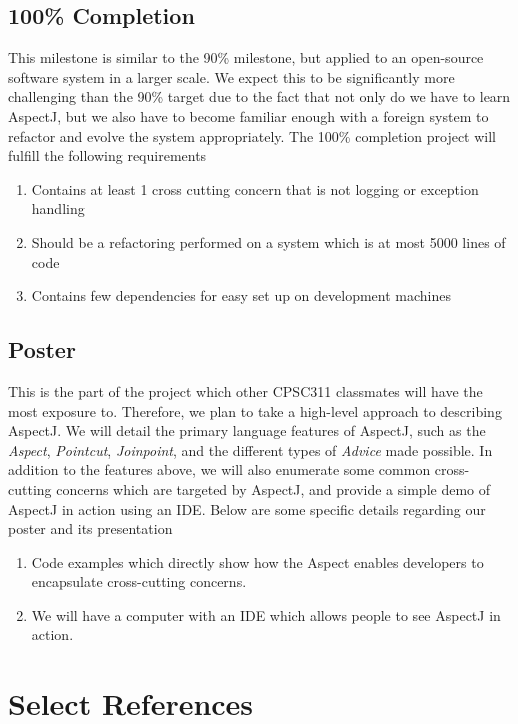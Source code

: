 \documentclass[sigconf]{acmart}
\begin{document}
\subsection{100\% Completion}
This milestone is similar to the 90\% milestone, but applied to an open-source software system in a larger scale. We expect this to be significantly more challenging than the 90\% target due to the fact that not only do we have to learn AspectJ, but we also have to become familiar enough with a foreign system to refactor and evolve the system appropriately. The 100\% completion project will fulfill the following requirements
\begin{enumerate}
    \item Contains at least 1 cross cutting concern that is not logging or exception handling
    \item Should be a refactoring performed on a system which is at most 5000 lines of code
    \item Contains few dependencies for easy set up on development machines
\end{enumerate}

\subsection{Poster}
This is the part of the project which other CPSC311 classmates will have the most exposure to. Therefore, we plan to take a high-level approach to describing AspectJ. We will detail the primary language features of AspectJ, such as the \textit{Aspect}, \textit{Pointcut}, \textit{Joinpoint}, and the different types of \textit{Advice} made possible. In addition to the features above, we will also enumerate some common cross-cutting concerns which are targeted by AspectJ, and provide a simple demo of AspectJ in action using an IDE. Below are some specific details regarding our poster and its presentation
\begin{enumerate}
    \item Code examples which directly show how the Aspect enables developers to encapsulate cross-cutting concerns.
    \item We will have a computer with an IDE which allows people to see AspectJ in action.
\end{enumerate}

\section{Select References}
\end{document}
